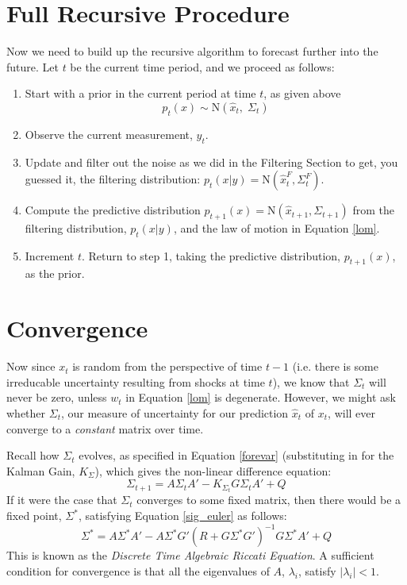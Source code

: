 \documentclass[a4paper,12pt]{article}
\begin{document}
\section{Full Recursive Procedure}

Now we need to build up the recursive algorithm to forecast 
further into the future. Let $t$ be the current time period, 
and we proceed as follows:
\begin{enumerate}
    \item Start with a prior in the current period at 
        time $t$, as given above
        \[ p_{t}(x) \sim \text{N}\left(\hat{x}_t, \; 
            \Sigma_t\right) \]
    \item Observe the current measurement, $y_t$.
    \item Update and filter out the noise as we did in
        the Filtering Section to get, you guessed it,
        the filtering distribution: $p_t(x | y) = 
        \text{N}(\hat{x}^F_t, \Sigma^F_t)$.
    \item Compute the predictive distribution 
        $p_{t+1}(x) = \text{N}(\hat{x}_{t+1}, \Sigma_{t+1})$
        from the filtering distribution, $p_t(x|y)$, and
        the law of motion in Equation \ref{lom}.
    \item Increment $t$. Return to step 1, taking
        the predictive distribution, $p_{t+1}(x)$, as
        the prior.
\end{enumerate}


\section{Convergence}

Now since $x_{t}$ is random from the perspective
of time $t-1$ (i.e. there is some irreducable uncertainty
resulting from shocks at time $t$), we know that $\Sigma_t$
will never be zero, unless $w_t$ in Equation \ref{lom} is 
degenerate. However, we might ask whether $\Sigma_t$, our
measure of uncertainty for our prediction $\hat{x}_t$
of $x_t$, will ever converge to a \emph{constant} matrix over
time. 

Recall how $\Sigma_t$ evolves, as specified in Equation 
\ref{forevar} (substituting in for the Kalman Gain, 
$K_\Sigma$), which gives the non-linear difference equation:
\begin{equation}
    \label{sig_euler}
    \Sigma_{t+1} = A\Sigma_t A' - K_{\Sigma_t} G \Sigma_t A' + Q
\end{equation}
If it were the case that $\Sigma_t$ converges to some fixed
matrix, then there would be a fixed point, $\Sigma^*$, satisfying 
Equation \ref{sig_euler} as follows:
\begin{equation}
    \label{riccati}
    \Sigma^* =
        A\Sigma^* A' - A\Sigma^* G' (R + G\Sigma^* G')^{-1} G \Sigma^* A' + Q
\end{equation}
This is known as the \emph{Discrete Time Algebraic Riccati Equation}.
A sufficient condition for convergence is that all the eigenvalues of
$A$, $\lambda_i$, satisfy $|\lambda_i|<1$. 
\end{document}
